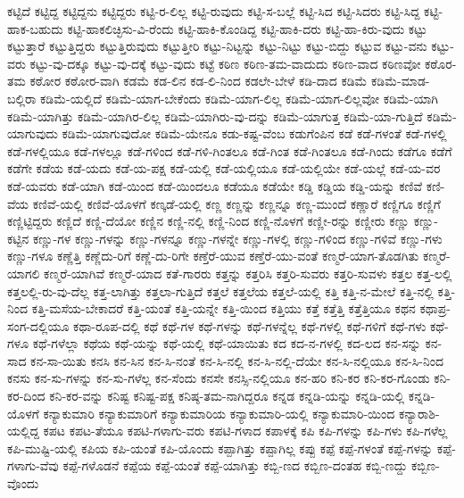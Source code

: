 {ಕಟ್ಟಿದೆ
ಕಟ್ಟಿದ್ದ
ಕಟ್ಟಿದ್ದನು
ಕಟ್ಟಿದ್ದರು
ಕಟ್ಟಿ-ರ-ಲಿಲ್ಲ
ಕಟ್ಟಿ-ರುವುದು
ಕಟ್ಟಿ-ಸ-ಬಲ್ಲೆ
ಕಟ್ಟಿ-ಸಿದ
ಕಟ್ಟಿ-ಸಿದರು
ಕಟ್ಟಿ-ಸಿದ್ದ
ಕಟ್ಟಿ-ಹಾಕ-ಬಹುದು
ಕಟ್ಟಿ-ಹಾಕಲಿಚ್ಛಿಸು-ವಿ-ರೆಂದು
ಕಟ್ಟಿ-ಹಾಕಿ-ಕೊಂಡಿದ್ದ
ಕಟ್ಟಿ-ಹಾಕಿ-ದರು
ಕಟ್ಟಿ-ಹಾ-ಕಿರು-ವುದು
ಕಟ್ಟು
ಕಟ್ಟುತ್ತಾರೆ
ಕಟ್ಟುತ್ತಿದ್ದರು
ಕಟ್ಟುತ್ತಿರುವುದು
ಕಟ್ಟುತ್ತೀರಿ
ಕಟ್ಟು-ನಿಟ್ಟನ್ನು
ಕಟ್ಟು-ನಿಟ್ಟು
ಕಟ್ಟು-ಬಿದ್ದು
ಕಟ್ಟುವ
ಕಟ್ಟು-ವನು
ಕಟ್ಟು-ವರು
ಕಟ್ಟು-ವು-ದಕ್ಕೂ
ಕಟ್ಟು-ವು-ದಕ್ಕೆ
ಕಟ್ಟು-ವುದು
ಕಟ್ಟೆ
ಕಠಿಣ
ಕಠಿಣ-ತಮ-ವಾದುದು
ಕಠಿಣ-ವಾದ
ಕಠಿಣವೋ
ಕಠೊರ-ತಮ
ಕಠೋರ
ಕಠೋರ-ವಾಗಿ
ಕಡಮೆ
ಕಡ-ಲಿನ
ಕಡ-ಲಿ-ನಿಂದ
ಕಡಲೇ-ಬೇಳೆ
ಕಡಿ-ದಾದ
ಕಡಿಮೆ
ಕಡಿಮೆ-ಮಾಡ-ಬಲ್ಲಿರಾ
ಕಡಿಮೆ-ಯಲ್ಲಿದೆ
ಕಡಿಮೆ-ಯಾಗ-ಬೇಕೆಂದು
ಕಡಿಮೆ-ಯಾಗ-ಲಿಲ್ಲ
ಕಡಿಮೆ-ಯಾಗ-ಲಿಲ್ಲವೋ
ಕಡಿಮೆ-ಯಾಗಿ
ಕಡಿಮೆ-ಯಾಗಿತ್ತು
ಕಡಿಮೆ-ಯಾಗಿರ-ಲಿಲ್ಲ
ಕಡಿಮೆ-ಯಾಗಿರು-ವು-ದನ್ನು
ಕಡಿಮೆ-ಯಾಗುತ್ತ
ಕಡಿಮೆ-ಯಾ-ಗುತ್ತಿದೆ
ಕಡಿಮೆ-ಯಾಗುವುದು
ಕಡಿಮೆ-ಯಾಗುವುದೋ
ಕಡಿಮೆ-ಯೇನೂ
ಕಡು-ಕಷ್ಟ-ವೆಂಬ
ಕಡುಗೆಂಪಿನ
ಕಡೆ
ಕಡೆ-ಗಳಂತೆ
ಕಡೆ-ಗಳಲ್ಲಿ
ಕಡೆ-ಗಳಲ್ಲಿಯೂ
ಕಡೆ-ಗಳಲ್ಲೂ
ಕಡೆ-ಗಳಿಂದ
ಕಡೆ-ಗಳಿ-ಗಿಂತಲೂ
ಕಡೆ-ಗಿಂತ
ಕಡೆ-ಗಿಂತಲೂ
ಕಡೆ-ಗಿಂದು
ಕಡೆಗೂ
ಕಡೆಗೆ
ಕಡೆಗೇ
ಕಡೆಯ
ಕಡೆ-ಯದು
ಕಡೆ-ಯ-ಪಕ್ಷ
ಕಡೆ-ಯಲ್ಲಿ
ಕಡೆ-ಯಲ್ಲಿಯೂ
ಕಡೆ-ಯಲ್ಲಿಯೇ
ಕಡೆ-ಯಲ್ಲೆ
ಕಡೆ-ಯ-ವರ
ಕಡೆ-ಯವರು
ಕಡೆ-ಯಾಗಿ
ಕಡೆ-ಯಿಂದ
ಕಡೆ-ಯಿಂದಲೂ
ಕಡೆಯೂ
ಕಡೆಯೇ
ಕಡ್ಡಿ
ಕಡ್ಡಿಯ
ಕಡ್ಡಿ-ಯನ್ನು
ಕಣಿವೆ
ಕಣಿ-ವೆಯ
ಕಣಿವೆ-ಯಲ್ಲಿ
ಕಣಿವೆ-ಯೊಳಗೆ
ಕಣ್ಕಡೆ-ಯಲ್ಲಿ
ಕಣ್ಣ
ಕಣ್ಣನ್ನು
ಕಣ್ಣನ್ನೂ
ಕಣ್ಣ-ಮುಂದೆ
ಕಣ್ಣಾರೆ
ಕಣ್ಣಿಗೂ
ಕಣ್ಣಿಗೆ
ಕಣ್ಣಿಟ್ಟಿದ್ದರು
ಕಣ್ಣಿದೆ
ಕಣ್ಣಿ-ದೆಯೋ
ಕಣ್ಣಿನ
ಕಣ್ಣಿ-ನಲ್ಲಿ
ಕಣ್ಣಿ-ನಿಂದ
ಕಣ್ಣಿ-ನೊಳಗೆ
ಕಣ್ಣೀ-ರನ್ನು
ಕಣ್ಣೀರು
ಕಣ್ಣು
ಕಣ್ಣು-ಕಟ್ಟಿನ
ಕಣ್ಣು-ಗಳ
ಕಣ್ಣು-ಗಳನ್ನು
ಕಣ್ಣು-ಗಳನ್ನೂ
ಕಣ್ಣು-ಗಳನ್ನೇ
ಕಣ್ಣು-ಗಳಲ್ಲಿ
ಕಣ್ಣು-ಗಳಿಂದ
ಕಣ್ಣು-ಗಳಿವೆ
ಕಣ್ಣು-ಗಳು
ಕಣ್ಣು-ಗಳೂ
ಕಣ್ಣೆತ್ತಿ
ಕಣ್ಣೆದು-ರಿಗೆ
ಕಣ್ಣೆ-ದು-ರಿಗೇ
ಕಣ್ತೆರೆ-ಯುವ
ಕಣ್ತೆರೆ-ಯು-ವಂತೆ
ಕಣ್ಮರೆ-ಯಾಗ-ತೊಡಗಿತು
ಕಣ್ಮರೆ-ಯಾಗಲಿ
ಕಣ್ಮರೆ-ಯಾಗಿವೆ
ಕಣ್ಮರೆ-ಯಾದ
ಕತೆ-ಗಾರರು
ಕತ್ತನ್ನು
ಕತ್ತರಿಸಿ
ಕತ್ತರಿ-ಸುವರು
ಕತ್ತರಿ-ಸುವಳು
ಕತ್ತಲ
ಕತ್ತ-ಲಲ್ಲಿ
ಕತ್ತಲಲ್ಲಿ-ರು-ವು-ದೆಲ್ಲ
ಕತ್ತ-ಲಾಗಿತ್ತು
ಕತ್ತಲಾ-ಗುತ್ತಿದೆ
ಕತ್ತಲೆ
ಕತ್ತಲೆಯ
ಕತ್ತಲೆ-ಯಲ್ಲಿ
ಕತ್ತಿ
ಕತ್ತಿ-ನ-ಮೇಲೆ
ಕತ್ತಿ-ನಲ್ಲಿ
ಕತ್ತಿ-ನಿಂದ
ಕತ್ತಿ-ಮಸೆಯ-ಬೇಕಾದರೆ
ಕತ್ತಿ-ಯಂತೆ
ಕತ್ತಿ-ಯನ್ನೇ
ಕತ್ತಿ-ಯಿಂದ
ಕತ್ತಿಯು
ಕತ್ತೆ
ಕತ್ತೆತ್ತಿ
ಕತ್ತೆತ್ತಿಯೂ
ಕಥನ
ಕಥಾಪ್ರ-ಸಂಗ-ದಲ್ಲಿಯೂ
ಕಥಾ-ರೂಪ-ದಲ್ಲಿ
ಕಥೆ
ಕಥೆ-ಗಳ
ಕಥೆ-ಗಳನ್ನು
ಕಥೆ-ಗಳನ್ನೆಲ್ಲ
ಕಥೆ-ಗಳಲ್ಲಿ
ಕಥೆ-ಗಳಿಗೆ
ಕಥೆ-ಗಳು
ಕಥೆ-ಗಳೂ
ಕಥೆ-ಗಳೆಲ್ಲಾ
ಕಥೆಯ
ಕಥೆ-ಯನ್ನು
ಕಥೆ-ಯಲ್ಲಿ
ಕಥೆ-ಯಾಯಿತು
ಕದ
ಕದ-ನ-ಗಳಲ್ಲಿ
ಕದ-ಲದ
ಕನ-ಸನ್ನು
ಕನ-ಸಾದ
ಕನ-ಸಾ-ಯಿತು
ಕನಸಿ
ಕನ-ಸಿನ
ಕನ-ಸಿ-ನಂತೆ
ಕನ-ಸಿ-ನಲ್ಲಿ
ಕನ-ಸಿ-ನಲ್ಲಿ-ದೆಯೇ
ಕನ-ಸಿ-ನಲ್ಲಿಯೂ
ಕನ-ಸಿ-ನಿಂದ
ಕನಸು
ಕನ-ಸು-ಗಳನ್ನು
ಕನ-ಸು-ಗಳೆಲ್ಲ
ಕನ-ಸೆಂದು
ಕನಸೇ
ಕನಸ್ಸಿ-ನಲ್ಲಿಯೂ
ಕನ-ಹರಿ
ಕನಿ-ಕರ
ಕನಿ-ಕರ-ಗೊಂಡು
ಕನಿ-ಕರ-ದಿಂದ
ಕನಿ-ಕರ-ವನ್ನು
ಕನಿಷ್ಟ
ಕನಿಷ್ಟ-ಪಕ್ಷ
ಕನಿಷ್ಠ-ತಮ-ನಾಗಿದ್ದರೂ
ಕನ್ನಡ
ಕನ್ನಡಿ-ಯನ್ನು
ಕನ್ನಡಿ-ಯಲ್ಲಿ
ಕನ್ನಡಿ-ಯೊಳಗೆ
ಕನ್ಯಾಕುಮಾರಿ
ಕನ್ಯಾಕುಮಾರಿಗೆ
ಕನ್ಯಾಕುಮಾರಿಯ
ಕನ್ಯಾಕುಮಾರಿ-ಯಲ್ಲಿ
ಕನ್ಯಾಕುಮಾರಿ-ಯಿಂದ
ಕನ್ಯಾರಾಶಿ-ಯಲ್ಲಿದ್ದ
ಕಪಟ
ಕಪಟ-ತೆಯೂ
ಕಪಟಿ-ಗಳಾಗು-ವರು
ಕಪಟಿ-ಗಳಾದ
ಕಪಾಳಕ್ಕೆ
ಕಪಿ
ಕಪಿ-ಗಳನ್ನು
ಕಪಿ-ಗಳು
ಕಪಿ-ಗಳೆಲ್ಲ
ಕಪಿ-ಮುಷ್ಟಿ-ಯಲ್ಲಿ
ಕಪಿಯ
ಕಪಿ-ಯಂತೆ
ಕಪಿ-ಯೊಂದು
ಕಪ್ಪಾಗಿತ್ತು
ಕಪ್ಪಾಗಿಲ್ಲ
ಕಪ್ಪು
ಕಪ್ಪೆ
ಕಪ್ಪೆ-ಗಳಂತೆ
ಕಪ್ಪೆ-ಗಳನ್ನು
ಕಪ್ಪೆ-ಗಳಾಗು-ವೆವು
ಕಪ್ಪೆ-ಗಳೊಡನೆ
ಕಪ್ಪೆಯ
ಕಪ್ಪೆ-ಯಂತೆ
ಕಪ್ಪೆ-ಯಾಗಿತ್ತು
ಕಬ್ಬಿ-ಣದ
ಕಬ್ಬಿಣ-ದಂತಹ
ಕಬ್ಬಿ-ಣದ್ದು
ಕಬ್ಬಿಣ-ವೊಂದು
}
